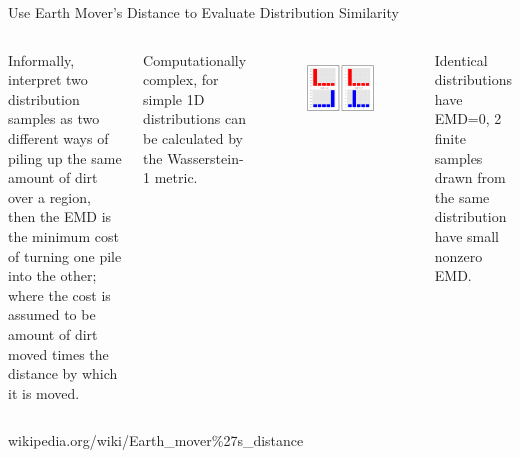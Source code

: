 \documentclass[aspectratio=169]{beamer}
\begin{document}
\begin{frame}{Use Earth Mover's Distance to Evaluate Distribution Similarity}
    \begin{columns}
Informally, interpret two distribution samples as two different ways of piling up the same amount of dirt over a region, then the EMD is the minimum cost of turning one pile into the other; where the cost is assumed to be amount of dirt moved times the distance by which it is moved.

Computationally complex, for simple 1D distributions can be calculated by the Wasserstein-1 metric.


 
 
 
 
 \begin{figure}[!h]
    \centering
    \includegraphics[width=.99\textwidth,trim={2.5cm 1.75cm 2cm 2.1cm},clip]{images/EMDSample.png}
    \label{fig:EMD}
\end{figure}
Identical distributions have EMD=0, 2 finite samples drawn from the same distribution have small nonzero EMD.

    \end{columns}
\small
wikipedia.org/wiki/Earth\_mover\%27s\_distance

\end{frame}
\end{document}
